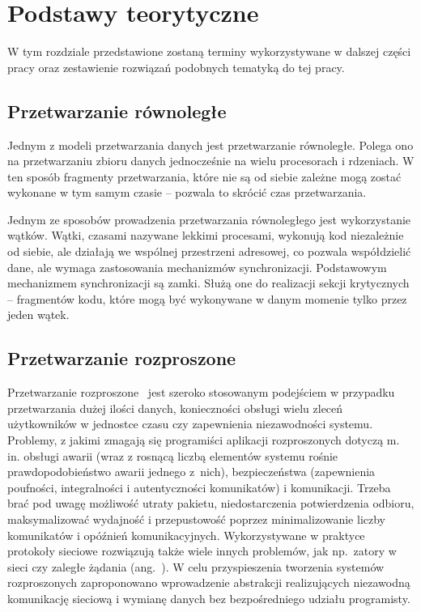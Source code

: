 
\chapter{Podstawy teorytyczne}

W tym rozdziale przedstawione zostaną terminy wykorzystywane w dalszej
części pracy oraz zestawienie rozwiązań podobnych tematyką do tej
pracy.


\section{Przetwarzanie równoległe}

\label{sec:background-rownolegle}Jednym z modeli przetwarzania danych
jest przetwarzanie równoległe. Polega ono na przetwarzaniu zbioru
danych jednocześnie na wielu procesorach i rdzeniach. W ten sposób
fragmenty przetwarzania, które nie są od siebie zależne mogą zostać
wykonane w tym samym czasie -- pozwala to skrócić czas przetwarzania.

Jednym ze sposobów prowadzenia przetwarzania równoległego jest wykorzystanie
wątków. Wątki, czasami nazywane lekkimi procesami, wykonują kod niezależnie
od siebie, ale działają we wspólnej przestrzeni adresowej, co pozwala
współdzielić dane, ale wymaga zastosowania mechanizmów synchronizacji.
Podstawowym mechanizmem synchronizacji są zamki. Służą one do realizacji
sekcji krytycznych -- fragmentów kodu, które mogą być wykonywane w
danym momenie tylko przez jeden wątek. 


\section{Przetwarzanie rozproszone}

\label{sec:background-Przetwarzanie-rozproszone} Przetwarzanie rozproszone~\cite{ArpaciDusseau14-Book}
jest szeroko stosowanym podejściem w przypadku przetwarzania dużej
ilości danych, konieczności obsługi wielu zleceń użytkowników w jednostce
czasu czy zapewnienia niezawodności systemu. Problemy, z jakimi zmagają
się programiści aplikacji rozproszonych dotyczą m. in. obsługi awarii
(wraz z rosnącą liczbą elementów systemu rośnie prawdopodobieństwo
awarii jednego z~nich), bezpieczeństwa (zapewnienia poufności, integralności
i autentyczności komunikatów) i komunikacji. Trzeba brać pod uwagę
możliwość utraty pakietu, niedostarczenia potwierdzenia odbioru, maksymalizować
wydajność i przepustowość poprzez minimalizowanie liczby komunikatów
i opóźnień komunikacyjnych. Wykorzystywane w praktyce protokoły sieciowe
rozwiązują także wiele innych problemów, jak np.~zatory w sieci czy
zaległe żądania (ang.~). W celu przyspieszenia
tworzenia systemów rozproszonych zaproponowano wprowadzenie abstrakcji
realizujących niezawodną komunikację sieciową i wymianę danych bez
bezpośredniego udziału programisty. 


